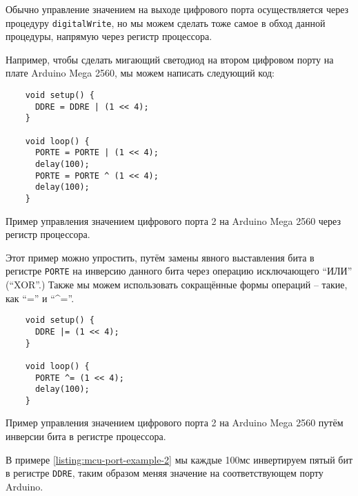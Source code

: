 \documentclass[../sparc.tex]{subfiles}
\begin{document}
Обычно управление значением на выходе цифрового порта осуществляется через
процедуру \texttt{digitalWrite}, но мы можем сделать тоже самое в обход
данной процедуры, напрямую через регистр процессора.

Например, чтобы сделать мигающий светодиод на втором цифровом порту на плате
Arduino Mega 2560, мы можем написать следующий код:

\begin{listing}[H]
  \begin{verbatim}
    void setup() {
      DDRE = DDRE | (1 << 4);
    }

    void loop() {
      PORTE = PORTE | (1 << 4);
      delay(100);
      PORTE = PORTE ^ (1 << 4);
      delay(100);
    }
  \end{verbatim}
  \caption{Пример управления значением цифрового порта 2 на Arduino Mega 2560
    через регистр процессора.}
  \label{listing:mcu-port-example-1}
\end{listing}

Этот пример можно упростить, путём замены явного выставления бита в регистре
\texttt{PORTE} на инверсию данного бита через операцию исключающего
``ИЛИ'' (``XOR''.)  Также мы можем использовать сокращённые формы операций --
такие, как ``\textbar='' и ``\^{}=''.

\begin{listing}[H]
  \begin{verbatim}
    void setup() {
      DDRE |= (1 << 4);
    }

    void loop() {
      PORTE ^= (1 << 4);
      delay(100);
    }
  \end{verbatim}
  \caption{Пример управления значением цифрового порта 2 на Arduino Mega 2560
    путём инверсии бита в регистре процессора.}
  \label{listing:mcu-port-example-2}
\end{listing}

В примере \ref{listing:mcu-port-example-2} мы каждые 100мс инвертируем пятый бит
в регистре \texttt{DDRE}, таким образом меняя значение на
соответствующем порту Arduino.
\end{document}
